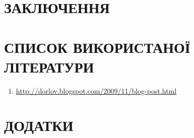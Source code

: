 \documentclass[oneside,final,14pt]{extreport}
\begin{document}






\chapter*{ЗАКЛЮЧЕННЯ}
\label{5decision::doc}\label{5decision:id1}

\pagebreak

\chapter*{СПИСОК ВИКОРИСТАНОЇ ЛІТЕРАТУРИ}
\label{6literature::doc}\label{6literature:id1}\begin{enumerate}
\item {} 
\href{http://dorlov.blogspot.com/2009/11/blog-post.html}{http://dorlov.blogspot.com/2009/11/blog-post.html}

\end{enumerate}

\pagebreak

\chapter*{ДОДАТКИ}
\label{7addition::doc}\label{7addition:id1}

\end{document}
